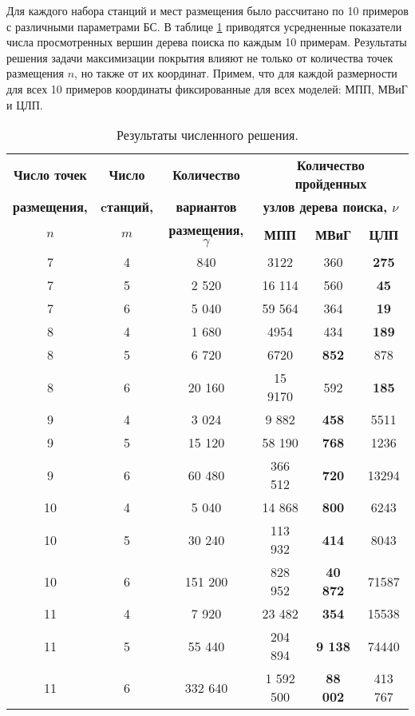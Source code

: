 Для каждого набора станций и мест размещения было рассчитано по 10 примеров с различными параметрами БС. В таблице \cref{tab:models_comparation} приводятся усредненные показатели числа просмотренных вершин дерева поиска по каждым 10 примерам. Результаты решения задачи максимизации покрытия влияют не только от количества точек размещения $n$, но также от их координат. Примем, что для каждой размерности для всех 10 примеров координаты фиксированные для всех моделей: МПП, МВиГ и ЦЛП. 


\begin{table}
  \caption{Результаты численного решения.}\label{tab:models_comparation}
  \begin{tabular}{|ccc|*{3}{c}|} \cline{3-6}
  \hline
  \textbf{Число точек} & \textbf{Число} &\textbf{Количество} & \multicolumn{3}{c|}{\textbf{Количество пройденных}}\\ 
  \textbf{размещения,} & \textbf{cтанций,} & \textbf{вариантов} & \multicolumn{3}{c|}{\textbf{узлов дерева поиска, $\nu$}}\\
  \cline{4-6}
  \textbf{$n$} & \textbf{$m$} &\textbf{размещения, $\gamma$} & \textbf{МПП}& \textbf{МВиГ} & \textbf{ЦЛП} \\ 
  \hline
  7 &  4 & 840 & 3122 & 360 &  \textbf{275} \\
  7 &  5 & 2 520 & 16 114 & 560  &  \textbf{45}  \\
  7 &  6 & 5 040 & 59 564 & 364  &  \textbf{19}  \\
  8 &  4 & 1 680 &  4954 &  434 &   \textbf{189} \\
  8 &  5 & 6 720 & 6720 & \textbf{852}  &  878 \\
  8 &  6 & 20 160 &  15 9170 & 592  & \textbf{185}  \\
  9  &  4 & 3 024 & 9 882 & \textbf{458} & 5511 \\
  9  &  5 & 15 120&  58 190 &  \textbf{768} &  1236\\
  9  &  6 & 60 480&  366 512 &  \textbf{720} & 13294 \\
  10 &  4 & 5 040&  14 868&  \textbf{800}&  6243\\
  10 &	5 & 30 240&  113 932&  \textbf{414}&  8043\\
  10 &	6 & 151 200&  828 952&  \textbf{40 872}&  71587\\
  11 &  4 & 7 920& 23 482&  \textbf{354} & 15538\\
  11 &	5 & 55 440& 204 894& \textbf{9 138}&  74440\\
  11 &	6 & 332 640& 1 592 500 & \textbf{88 002} & 413 767 \\
  \hline
  \end{tabular}
\end{table} 

